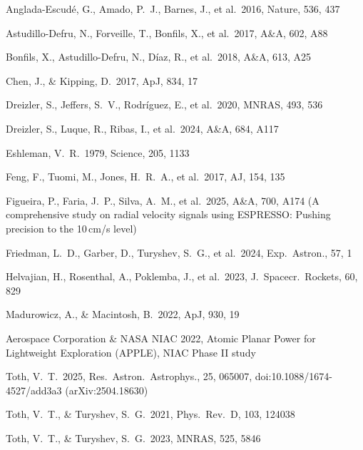 \documentclass[twocolumn,10pt]{article}
\begin{document}
\begin{thebibliography}{}

Anglada-Escud\'e, G., Amado, P.~J., Barnes, J., et al.\ 2016, Nature, 536, 437

Astudillo-Defru, N., Forveille, T., Bonfils, X., et al.\ 2017, A\&A, 602, A88

Bonfils, X., Astudillo-Defru, N., D\'iaz, R., et al.\ 2018, A\&A, 613, A25

Chen, J., \& Kipping, D.\ 2017, ApJ, 834, 17

Dreizler, S., Jeffers, S.~V., Rodr\'iguez, E., et al.\ 2020, MNRAS, 493, 536

Dreizler, S., Luque, R., Ribas, I., et al.\ 2024, A\&A, 684, A117

Eshleman, V.~R.\ 1979, Science, 205, 1133

Feng, F., Tuomi, M., Jones, H.~R.~A., et al.\ 2017, AJ, 154, 135

Figueira, P., Faria, J.~P., Silva, A.~M., et al.\ 2025, A\&A, 700, A174
(A comprehensive study on radial velocity signals using ESPRESSO: Pushing
precision to the 10\,cm/s level)

Friedman, L.~D., Garber, D., Turyshev, S.~G., et al.\ 2024, Exp.\ Astron., 57, 1

Helvajian, H., Rosenthal, A., Poklemba, J., et al.\ 2023, J.\ Spacecr.\ Rockets, 60, 829

Madurowicz, A., \& Macintosh, B.\ 2022, ApJ, 930, 19

Aerospace Corporation \& NASA NIAC 2022, Atomic Planar Power for Lightweight Exploration (APPLE), NIAC Phase II study

Toth, V.~T.\ 2025, Res.\ Astron.\ Astrophys., 25, 065007, doi:10.1088/1674-4527/add3a3 (arXiv:2504.18630)

Toth, V.~T., \& Turyshev, S.~G.\ 2021, Phys.\ Rev.\ D, 103, 124038

Toth, V.~T., \& Turyshev, S.~G.\ 2023, MNRAS, 525, 5846


\end{thebibliography}
\end{document}
